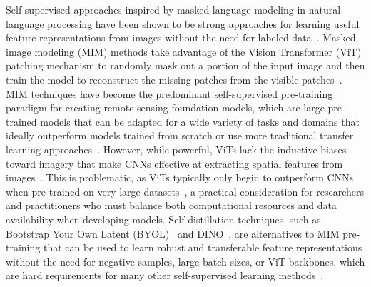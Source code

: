 Self-supervised approaches inspired by masked language modeling in natural language processing have been shown to be strong approaches for learning useful feature representations from images without the need for labeled data~\citep{heMaskedAutoencodersAre2022, xieSimMIMSimpleFramework2022}.
Masked image modeling (MIM) methods take advantage of the Vision Transformer (ViT) patching mechanism to randomly mask out a portion of the input image and then train the model to reconstruct the missing patches from the visible patches~\citep{linSSMAESpatialSpectral2023,wangFeatureGuidedMasked2025}.
MIM techniques have become the predominant self-supervised pre-training paradigm for creating remote sensing foundation models, which are large pre-trained models that can be adapted for a wide variety of tasks and domains that ideally outperform models trained from scratch or use more traditional transfer learning approaches~\citep{hongSpectralGPTSpectralRemote2024,wangAdvancingPlainVision2023}.
However, while powerful, ViTs lack the inductive biases toward imagery that make CNNs effective at extracting spatial features from images~\citep{adadiSurveyDataefficientAlgorithms2021}.
This is problematic, as ViTs typically only begin to outperform CNNs when pre-trained on very large datasets~\citep{dosovitskiyImageWorth16x162020}, a practical consideration for researchers and practitioners who must balance both computational resources and data availability when developing models.
Self-distillation techniques, such as Bootstrap Your Own Latent (BYOL)~\citep{grillBootstrapYourOwn2020} and DINO~\citep{caronEmergingPropertiesSelfSupervised2021}, are alternatives to MIM pre-training that can be used to learn robust and transferable feature representations without the need for negative samples, large batch sizes, or ViT backbones, which are hard requirements for many other self-supervised learning methods~\citep{chenSimpleFrameworkContrastive2020, chenWhyWeNeed2022}.
